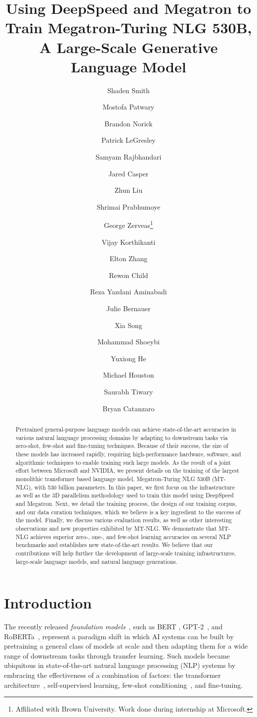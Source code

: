 \documentclass[11pt]{article}
\title{Using DeepSpeed and Megatron to Train Megatron-Turing NLG 530B, A Large-Scale Generative Language Model}
\author[,]{Shaden Smith}
\author[,]{Mostofa Patwary}
\author[]{Brandon Norick}
\author[]{Patrick LeGresley}
\author[]{Samyam Rajbhandari}
\author[]{Jared Casper}
\author[]{Zhun Liu}
\author[]{Shrimai Prabhumoye}
\author[]{George Zerveas\footnote{Affiliated with Brown University. Work done during internship at Microsoft.}}
\author[]{Vijay Korthikanti}
\author[]{Elton Zhang}
\author[]{Rewon Child}
\author[]{Reza Yazdani Aminabadi}
\author[]{Julie Bernauer}
\author[]{Xia Song}
\author[]{Mohammad Shoeybi}
\author[]{Yuxiong He}
\author[]{Michael Houston}
\author[]{Saurabh Tiwary}
\author[]{Bryan Catanzaro}
\affil[]{equal contribution}
\affil[]{Microsoft}
\affil[]{NVIDIA}
\date{}
\newcommand{\ours}{MT-NLG}
\begin{document}
\parindent 0.0in
\parskip 0.15in

\maketitle

\begin{abstract}


Pretrained general-purpose language models can achieve state-of-the-art accuracies in various natural language processing domains by adapting to downstream tasks via zero-shot, few-shot and fine-tuning techniques. Because of their success, the size of these models has increased rapidly, requiring high-performance hardware, software, and algorithmic techniques to enable training such large models. As the result of a joint effort between Microsoft and NVIDIA, we present details on the training of the largest monolithic transformer based language model, Megatron-Turing NLG 530B ({\ours}), with 530 billion parameters. In this paper, we first focus on the infrastructure as well as the 3D parallelism methodology used to train this model using DeepSpeed and Megatron. Next, we detail the training process, the design of our training corpus, and our data curation techniques, which we believe is a key ingredient to the success of the model. Finally, we discuss various evaluation results, as well as other interesting observations and new properties exhibited by {\ours}. We demonstrate that {\ours} achieves superior zero-, one-, and  few-shot learning  accuracies on  several  NLP  benchmarks and establishes new state-of-the-art results. We believe that our contributions will help further the development of large-scale training infrastructures, large-scale language models, and natural language generations.
\end{abstract}

\section{Introduction}


The recently released \emph{foundation models}~\cite{bommasani2021opportunities}, such as BERT \cite{Devlin2019BERTPO}, GPT-2~\cite{gpt2-radford2019language}, and RoBERTa~\cite{liu2019roberta}, represent a paradigm shift in which AI systems can be built by pretraining a general class of models at scale and then adapting them for a wide range of downstream tasks through transfer learning. Such models became ubiquitous in state-of-the-art natural language processing (NLP) systems by embracing the effectiveness of a combination of factors: the transformer architecture~\cite{DBLP:journals/corr/VaswaniSPUJGKP17}, self-supervised learning, few-shot conditioning~\cite{brown2020language}, and fine-tuning.
\end{document}
